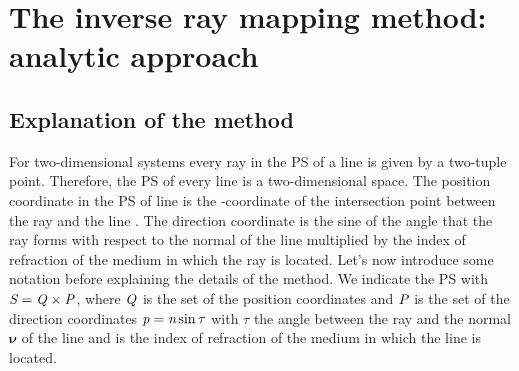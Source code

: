 
\chapter{The inverse ray mapping method: analytic approach}
\section{Explanation of the method}
For two-dimensional systems every ray in the PS of a line is given by a two-tuple point. Therefore, the PS of every line is a two-dimensional space.
The position coordinate in the PS of line  is the -coordinate of the intersection point between the ray and the line .
The direction coordinate is the sine of the angle that the ray forms with respect to the normal of the line  multiplied by the index of refraction of the medium in which the ray is located.
Let's now introduce some notation before explaining the details of the method. We indicate the PS with $\emph{S}_{\textit{}}=\emph{Q}_{\textit{}}\times\emph{P}_{\textit{}}$,
where $\emph{Q}_{\textit{}}$ is the set of the position coordinates  and $\emph{P}_{\textit{}}$ is the set of the direction coordinates $\textit{p}=\textit{n}\sin{\tau}$ with $\tau$ the angle between the ray and the normal \textit{$\boldsymbol{\nu}$} of the line and  is the index of refraction of the medium in which the line is located.  
